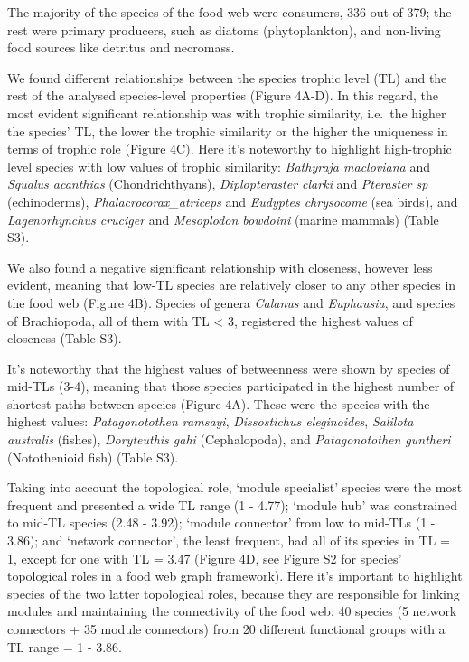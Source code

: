 \documentclass[preprint, 3p,
authoryear]{elsarticle} %
\begin{document}
The majority of the species of the food web were consumers, 336 out of
379; the rest were primary producers, such as diatoms (phytoplankton),
and non-living food sources like detritus and necromass.

We found different relationships between the species trophic level (TL)
and the rest of the analysed species-level properties (Figure 4A-D). In
this regard, the most evident significant relationship was with trophic
similarity, i.e.~the higher the species' TL, the lower the trophic
similarity or the higher the uniqueness in terms of trophic role (Figure
4C). Here it's noteworthy to highlight high-trophic level species with
low values of trophic similarity: \emph{Bathyraja macloviana} and
\emph{Squalus acanthias} (Chondrichthyans), \emph{Diplopteraster clarki}
and \emph{Pteraster sp} (echinoderms), \emph{Phalacrocorax\_atriceps}
and \emph{Eudyptes chrysocome} (sea birds), and \emph{Lagenorhynchus
cruciger} and \emph{Mesoplodon bowdoini} (marine mammals) (Table S3).

We also found a negative significant relationship with closeness,
however less evident, meaning that low-TL species are relatively closer
to any other species in the food web (Figure 4B). Species of genera
\emph{Calanus} and \emph{Euphausia}, and species of Brachiopoda, all of
them with TL \textless{} 3, registered the highest values of closeness
(Table S3).

It's noteworthy that the highest values of betweenness were shown by
species of mid-TLs (3-4), meaning that those species participated in the
highest number of shortest paths between species (Figure 4A). These were
the species with the highest values: \emph{Patagonotothen ramsayi},
\emph{Dissostichus eleginoides}, \emph{Salilota australis} (fishes),
\emph{Doryteuthis gahi} (Cephalopoda), and \emph{Patagonotothen
guntheri} (Notothenioid fish) (Table S3).

Taking into account the topological role, `module specialist' species
were the most frequent and presented a wide TL range (1 - 4.77); `module
hub' was constrained to mid-TL species (2.48 - 3.92); `module connector'
from low to mid-TLs (1 - 3.86); and `network connector', the least
frequent, had all of its species in TL = 1, except for one with TL =
3.47 (Figure 4D, see Figure S2 for species' topological roles in a food
web graph framework). Here it's important to highlight species of the
two latter topological roles, because they are responsible for linking
modules and maintaining the connectivity of the food web: 40 species (5
network connectors + 35 module connectors) from 20 different functional
groups with a TL range = 1 - 3.86.
\end{document}
